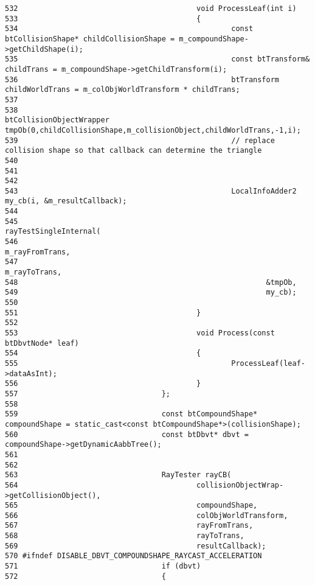 \begin{Code}
\begin{verbatim}
532                                         void ProcessLeaf(int i)
533                                         {
534                                                 const btCollisionShape* childCollisionShape = m_compoundShape->getChildShape(i);
535                                                 const btTransform& childTrans = m_compoundShape->getChildTransform(i);
536                                                 btTransform childWorldTrans = m_colObjWorldTransform * childTrans;
537                                                 
538                                                 btCollisionObjectWrapper tmpOb(0,childCollisionShape,m_collisionObject,childWorldTrans,-1,i);
539                                                 // replace collision shape so that callback can determine the triangle
540 
541                                                 
542 
543                                                 LocalInfoAdder2 my_cb(i, &m_resultCallback);
544 
545                                                 rayTestSingleInternal(
546                                                         m_rayFromTrans,
547                                                         m_rayToTrans,
548                                                         &tmpOb,
549                                                         my_cb);
550                                                 
551                                         }
552                                 
553                                         void Process(const btDbvtNode* leaf)
554                                         {
555                                                 ProcessLeaf(leaf->dataAsInt);
556                                         }
557                                 };
558                                 
559                                 const btCompoundShape* compoundShape = static_cast<const btCompoundShape*>(collisionShape);
560                                 const btDbvt* dbvt = compoundShape->getDynamicAabbTree();
561 
562 
563                                 RayTester rayCB(
564                                         collisionObjectWrap->getCollisionObject(),
565                                         compoundShape,
566                                         colObjWorldTransform,
567                                         rayFromTrans,
568                                         rayToTrans,
569                                         resultCallback);
570 #ifndef DISABLE_DBVT_COMPOUNDSHAPE_RAYCAST_ACCELERATION
571                                 if (dbvt)
572                                 {

\end{verbatim}
\end{Code}
